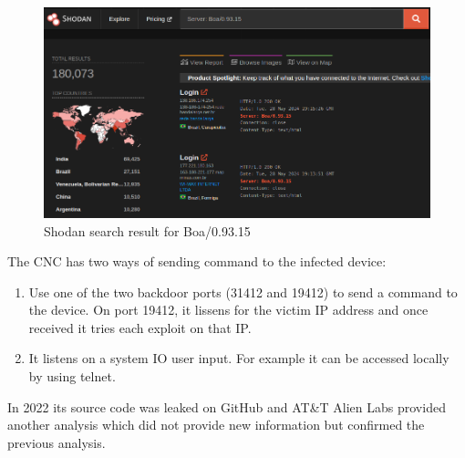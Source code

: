 \begin{figure}[ht]
    \centering
    \includegraphics[scale=0.4]{resources/images/boa-shodan.png}
    \caption{Shodan search result for Boa/0.93.15}
    \label{fig:boa-shodan}
\end{figure}

The CNC has two ways of sending command to the infected device:

\begin{enumerate}
    \item Use one of the two backdoor ports (31412 and 19412) to send a command to the device. On port 19412, it lissens for the victim IP address and once received it tries each exploit on that IP.
    \item It listens on a system IO user input. For example it can be accessed locally by using telnet. 
\end{enumerate}

In 2022 its source code was leaked on GitHub and AT\&T Alien Labs provided another analysis which did not provide new information but confirmed the previous analysis. \cite{att-botenago-reverse,att-botenago-sourcecode}

